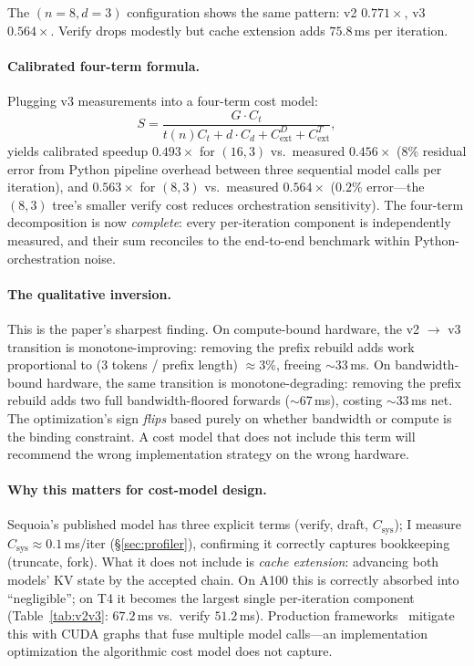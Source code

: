 \documentclass[letterpaper,twocolumn,10pt]{article}
\begin{document}
The $(n{=}8, d{=}3)$ configuration shows the same pattern: v2 $0.771\times$, v3 $0.564\times$.
Verify drops modestly but cache extension adds $75.8$\,ms per iteration.

\paragraph{Calibrated four-term formula.}
Plugging v3 measurements into a four-term cost model:
\[
S = \frac{G \cdot C_t}{t(n) C_t + d \cdot C_d + C_{\text{ext}}^D + C_{\text{ext}}^T},
\]
yields calibrated speedup $0.493\times$ for $(16,3)$ vs.\ measured $0.456\times$ ($8\%$ residual error from Python pipeline overhead between three sequential model calls per iteration), and $0.563\times$ for $(8,3)$ vs.\ measured $0.564\times$ ($0.2\%$ error---the $(8,3)$ tree's smaller verify cost reduces orchestration sensitivity).
The four-term decomposition is now \emph{complete}: every per-iteration component is independently measured, and their sum reconciles to the end-to-end benchmark within Python-orchestration noise.

\paragraph{The qualitative inversion.}
This is the paper's sharpest finding.
On compute-bound hardware, the v2 $\to$ v3 transition is monotone-improving: removing the prefix rebuild adds work proportional to (3 tokens / prefix length) $\approx 3\%$, freeing $\sim$33\,ms.
On bandwidth-bound hardware, the same transition is monotone-degrading: removing the prefix rebuild adds two full bandwidth-floored forwards ($\sim$67\,ms), costing $\sim$33\,ms net.
The optimization's sign \emph{flips} based purely on whether bandwidth or compute is the binding constraint.
A cost model that does not include this term will recommend the wrong implementation strategy on the wrong hardware.

\paragraph{Why this matters for cost-model design.}
Sequoia's published model has three explicit terms (verify, draft, $C_{\text{sys}}$); I measure $C_{\text{sys}} \approx 0.1$\,ms/iter (\S\ref{sec:profiler}), confirming it correctly captures bookkeeping (truncate, fork).
What it does not include is \emph{cache extension}: advancing both models' KV state by the accepted chain.
On A100 this is correctly absorbed into ``negligible''; on T4 it becomes the largest single per-iteration component (Table~\ref{tab:v2v3}: $67.2$\,ms vs.\ verify $51.2$\,ms).
Production frameworks~\cite{vllm_docs,trtllm_docs} mitigate this with CUDA graphs that fuse multiple model calls---an implementation optimization the algorithmic cost model does not capture.
\end{document}
